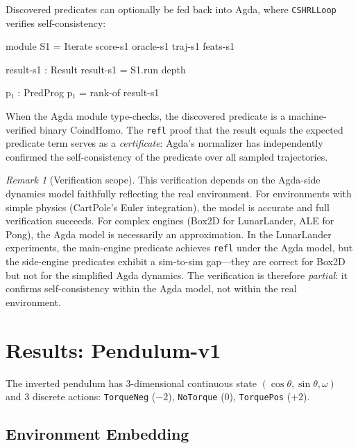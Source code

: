 \documentclass[9pt,a4paper]{article}
\theoremstyle{plain}
\theoremstyle{definition}
\theoremstyle{remark}
\newtheorem{remark}{Remark}
\begin{document}
Discovered predicates can optionally be fed back into Agda, where
\texttt{CSHRLLoop} verifies self-consistency:

\begin{spec}
module S1 = Iterate score-s1 oracle-s1 traj-s1 feats-s1

result-s1 : Result
result-s1 = S1.run depth

p₁ : PredProg
p₁ = rank-of result-s1
\end{spec}

When the Agda module type-checks, the discovered predicate is a
machine-verified binary CoindHomo. The \texttt{refl} proof that
the result equals the expected predicate term serves as a
\emph{certificate}: Agda's normalizer has independently confirmed
the self-consistency of the predicate over all sampled trajectories.

\begin{remark}[Verification scope]
This verification depends on the Agda-side dynamics model
faithfully reflecting the real environment.  For environments
with simple physics (CartPole's Euler integration), the model
is accurate and full verification succeeds.  For complex engines
(Box2D for LunarLander, ALE for Pong), the Agda
model is necessarily an approximation.  In the LunarLander
experiments, the main-engine predicate achieves \texttt{refl}
under the Agda model, but the side-engine predicates exhibit a
sim-to-sim gap---they are correct for Box2D but not for the
simplified Agda dynamics.  The verification is therefore
\emph{partial}: it confirms self-consistency within the Agda model,
not within the real environment.
\end{remark}

\section{Results: Pendulum-v1}
\label{sec:pendulum}

The inverted pendulum has 3-dimensional continuous state
$(\cos\theta, \sin\theta, \omega)$ and 3 discrete actions:
\texttt{TorqueNeg} ($-2$), \texttt{NoTorque} ($0$),
\texttt{TorquePos} ($+2$).

\subsection{Environment Embedding}
\end{document}
